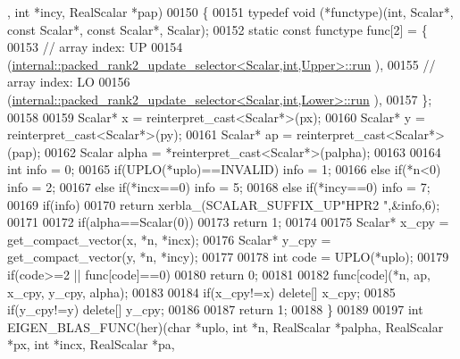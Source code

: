\begin{DoxyCode}
      , \textcolor{keywordtype}{int} *incy, RealScalar *pap)
00150 \{
00151   \textcolor{keyword}{typedef} void (*functype)(int, Scalar*, \textcolor{keyword}{const} Scalar*, \textcolor{keyword}{const} Scalar*, Scalar);
00152   \textcolor{keyword}{static} \textcolor{keyword}{const} functype func[2] = \{
00153     \textcolor{comment}{// array index: UP}
00154     (\hyperlink{structinternal_1_1packed__rank2__update__selector}{internal::packed\_rank2\_update\_selector<Scalar,int,Upper>::run}
      ),
00155     \textcolor{comment}{// array index: LO}
00156     (\hyperlink{structinternal_1_1packed__rank2__update__selector}{internal::packed\_rank2\_update\_selector<Scalar,int,Lower>::run}
      ),
00157   \};
00158 
00159   Scalar* x = \textcolor{keyword}{reinterpret\_cast<}Scalar*\textcolor{keyword}{>}(px);
00160   Scalar* y = \textcolor{keyword}{reinterpret\_cast<}Scalar*\textcolor{keyword}{>}(py);
00161   Scalar* ap = \textcolor{keyword}{reinterpret\_cast<}Scalar*\textcolor{keyword}{>}(pap);
00162   Scalar alpha = *\textcolor{keyword}{reinterpret\_cast<}Scalar*\textcolor{keyword}{>}(palpha);
00163 
00164   \textcolor{keywordtype}{int} info = 0;
00165   \textcolor{keywordflow}{if}(UPLO(*uplo)==INVALID)                                            info = 1;
00166   \textcolor{keywordflow}{else} \textcolor{keywordflow}{if}(*n<0)                                                       info = 2;
00167   \textcolor{keywordflow}{else} \textcolor{keywordflow}{if}(*incx==0)                                                   info = 5;
00168   \textcolor{keywordflow}{else} \textcolor{keywordflow}{if}(*incy==0)                                                   info = 7;
00169   \textcolor{keywordflow}{if}(info)
00170     \textcolor{keywordflow}{return} xerbla\_(SCALAR\_SUFFIX\_UP\textcolor{stringliteral}{"HPR2 "},&info,6);
00171 
00172   \textcolor{keywordflow}{if}(alpha==Scalar(0))
00173     \textcolor{keywordflow}{return} 1;
00174 
00175   Scalar* x\_cpy = get\_compact\_vector(x, *n, *incx);
00176   Scalar* y\_cpy = get\_compact\_vector(y, *n, *incy);
00177 
00178   \textcolor{keywordtype}{int} code = UPLO(*uplo);
00179   \textcolor{keywordflow}{if}(code>=2 || func[code]==0)
00180     \textcolor{keywordflow}{return} 0;
00181 
00182   func[code](*n, ap, x\_cpy, y\_cpy, alpha);
00183 
00184   \textcolor{keywordflow}{if}(x\_cpy!=x)  \textcolor{keyword}{delete}[] x\_cpy;
00185   \textcolor{keywordflow}{if}(y\_cpy!=y)  \textcolor{keyword}{delete}[] y\_cpy;
00186 
00187   \textcolor{keywordflow}{return} 1;
00188 \}
00189 
00197 \textcolor{keywordtype}{int} EIGEN\_BLAS\_FUNC(her)(\textcolor{keywordtype}{char} *uplo, \textcolor{keywordtype}{int} *n, RealScalar *palpha, RealScalar *px, \textcolor{keywordtype}{int} *incx, RealScalar *pa,

\end{DoxyCode}
